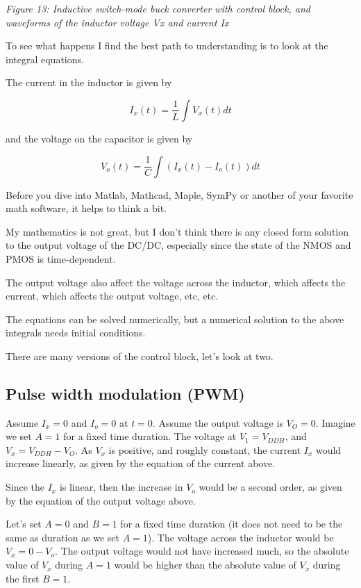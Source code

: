 {
\centering
{}
}

\emph{Figure 13: Inductive switch-mode buck converter with control
block, and waveforms of the inductor voltage Vx and current Ix}

To see what happens I find the best path to understanding is to look at
the integral equations.

The current in the inductor is given by

\[I_x(t) = \frac{1}{L} \int{V_x(t) dt}\]

and the voltage on the capacitor is given by

\[V_o(t) = \frac{1}{C} \int{(I_x(t) - I_o(t))}dt\]

Before you dive into Matlab, Mathcad, Maple, SymPy or another of your
favorite math software, it helps to think a bit.

My mathematics is not great, but I don't think there is any closed form
solution to the output voltage of the DC/DC, especially since the state
of the NMOS and PMOS is time-dependent.

The output voltage also affect the voltage across the inductor, which
affects the current, which affects the output voltage, etc, etc.

The equations can be solved numerically, but a numerical solution to the
above integrals needs initial conditions.

There are many versions of the control block, let's look at two.

\subsection{Pulse width modulation
(PWM)}\label{pulse-width-modulation-pwm}

Assume \(I_x=0\) and \(I_{o} = 0\) at \(t=0\). Assume the output voltage
is \(V_O=0\). Imagine we set \(A=1\) for a fixed time duration. The
voltage at \(V_1=V_{DDH}\), and \(V_x = V_{DDH}-V_O\). As \(V_x\) is
positive, and roughly constant, the current \(I_x\) would increase
linearly, as given by the equation of the current above.

Since the \(I_x\) is linear, then the increase in \(V_o\) would be a
second order, as given by the equation of the output voltage above.

Let's set \(A=0\) and \(B=1\) for a fixed time duration (it does not
need to be the same as duration as we set \(A=1\)). The voltage across
the inductor would be \(V_x = 0 - V_o\). The output voltage would not
have increased much, so the absolute value of \(V_x\) during \(A=1\)
would be higher than the absolute value of \(V_x\) during the first
\(B=1\).

